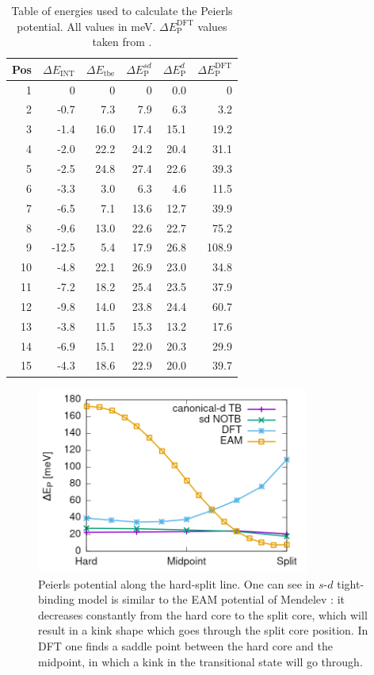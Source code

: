 \documentclass[a4paper,11pt]{article}
\begin{document}
\begin{table}[htbp]
\caption{Table of energies used to calculate the Peierls potential. All values in meV. \(\Delta E_{\text{P}}^{\text{DFT}}\) values taken from \cite{Itakura2012}. \label{tab:peierlspot}}
\centering
\begin{tabular}{rrrrrr}
Pos & \(\Delta E_{\text{INT}}\) & \(\Delta E_{\text{tbe}}\) & \(\Delta E_{\text{P}}^{sd}\) & \(\Delta E_{\text{P}}^{d}\) & \(\Delta E_{\text{P}}^{\text{DFT}}\)\\
\hline
1 & 0 & 0 & 0 & 0.0 & 0\\
2 & -0.7 & 7.3 & 7.9 & 6.3 & 3.2\\
3 & -1.4 & 16.0 & 17.4 & 15.1 & 19.2\\
4 & -2.0 & 22.2 & 24.2 & 20.4 & 31.1\\
5 & -2.5 & 24.8 & 27.4 & 22.6 & 39.3\\
6 & -3.3 & 3.0 & 6.3 & 4.6 & 11.5\\
7 & -6.5 & 7.1 & 13.6 & 12.7 & 39.9\\
8 & -9.6 & 13.0 & 22.6 & 22.7 & 75.2\\
9 & -12.5 & 5.4 & 17.9 & 26.8 & 108.9\\
10 & -4.8 & 22.1 & 26.9 & 23.0 & 34.8\\
11 & -7.2 & 18.2 & 25.4 & 23.5 & 37.9\\
12 & -9.8 & 14.0 & 23.8 & 24.4 & 60.7\\
13 & -3.8 & 11.5 & 15.3 & 13.2 & 17.6\\
14 & -6.9 & 15.1 & 22.0 & 20.3 & 29.9\\
15 & -4.3 & 18.6 & 22.9 & 20.0 & 39.7\\
\end{tabular}
\end{table}


\begin{figure}[htbp]

\includegraphics[width=0.8\textwidth]{Images/hard-split_transition_w_canonical.png}
\caption{Peierls potential along the hard-split line. One can see in \(s\text{-}d\) tight-binding model is similar to the EAM potential of Mendelev \cite{Mendelev2003}: it decreases constantly from the hard core to the split core, which will result in a kink shape which goes through the split core position. In DFT one finds a saddle point between the hard core and the midpoint, in which a kink in the transitional state will go through. \label{hardsplittransition}}
\end{figure}
\end{document}
